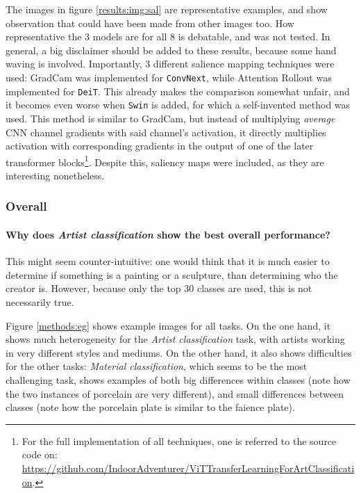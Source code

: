 The images in figure \ref{results:img:sal} are representative examples, and show observation that could have been made from other images too. How representative the 3 models are for all 8 is debatable, and was not tested. In general, a big disclaimer should be added to these results, because some hand waving is involved. Importantly, 3 different salience mapping techniques were used: GradCam \citep{selvaraju2017grad} was implemented for \texttt{ConvNext}, while Attention Rollout \citep{abnar2020quantifying} was implemented for \texttt{DeiT}. This already makes the comparison somewhat unfair, and it becomes even worse when \texttt{Swin} is added, for which a self-invented method was used. This method is similar to GradCam, but instead of multiplying \textit{average} CNN channel gradients with said channel's activation, it directly multiplies activation with corresponding gradients in the output of one of the later transformer blocks\footnote{For the full implementation of all techniques, one is referred to the source code on: \\ \url{https://github.com/IndoorAdventurer/ViTTransferLearningForArtClassification}.}. Despite this, saliency maps were included, as they are interesting nonetheless.

\subsubsection{Overall}

\paragraph{Why does \textit{Artist classification} show the best overall performance?}
This might seem counter-intuitive: one would think that it is much easier to determine if something is a painting or a sculpture, than determining who the creator is. However, because only the top 30 classes are used, this is not necessarily true.

Figure \ref{methods:eg} shows example images for all tasks. On the one hand, it shows much heterogeneity for the \textit{Artist classification} task, with artists working in very different styles and mediums. On the other hand, it also shows difficulties for the other tasks: \textit{Material classification}, which seems to be the most challenging task, shows examples of both big differences within classes (note how the two instances of porcelain are very different), and small differences between classes (note how the porcelain plate is similar to the faience plate).

